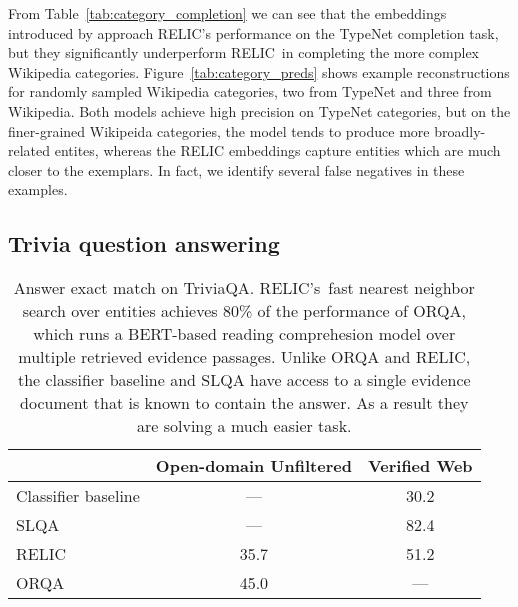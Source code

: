 \documentclass{article} \usepackage{iclr2020_conference,times}
\newcommand{\ack}{RELIC\xspace}
\begin{document}
From Table~\ref{tab:category_completion} we can see that the embeddings introduced by \citealt{yamada-etal-2017-learning} approach \ack's  performance on the TypeNet completion task, but they significantly underperform \ack~in completing the more complex Wikipedia categories.
Figure~\ref{tab:category_preds} shows example reconstructions for randomly sampled Wikipedia categories, two from TypeNet and three from Wikipedia. 
Both models achieve high precision on TypeNet categories, but on the finer-grained Wikipeida categories, the \citet{yamada-etal-2017-learning} model tends to
produce more broadly-related entites, whereas the \ack embeddings capture entities which are much closer to the exemplars.
In fact, we identify several false negatives in these examples.








\subsection{Trivia question answering}
\label{sec:trivia-qa}





\begin{table}[]
    \small
    \centering
    \begin{tabular}{|l|c|c|}
    \hline
          & Open-domain Unfiltered & Verified Web \\\hline
    Classifier baseline \citep{joshi2017triviaqa} & ---  & 30.2 \\
    SLQA \citep{wang2018multi}                    & ---  & 82.4 \\
    \hline
    \ack                                          & 35.7 & 51.2 \\ 
    ORQA \citep{lee-etal-2019-latent}             & 45.0 & ---  \\
    \hline
    \end{tabular}
    \caption{Answer exact match on TriviaQA. \ack's~fast nearest neighbor search over entities achieves 80\% of the performance of ORQA, which runs a BERT-based reading comprehesion model over multiple retrieved evidence passages. Unlike ORQA and \ack, the classifier baseline and SLQA have access to a single evidence document that is known to contain the answer. As a result they are solving a much easier task. } \label{tab:triviaqa_results}
\end{table}
\end{document}
